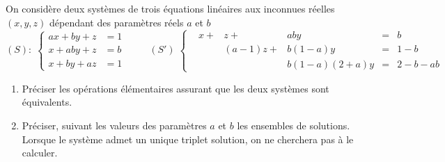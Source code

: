 On considère deux systèmes de trois équations linéaires aux inconnues réelles $(x,y,z)$ dépendant des paramètres réels $a$ et $b$
\begin{displaymath}
(S):\;\left\lbrace 
\begin{aligned}
  ax + by + z &= 1 \\ x + aby + z &= b \\ x + by + az &= 1
\end{aligned}
\right. 
\hspace{1cm}
(S')\;
\left\lbrace 
\begin{aligned}
 &x + &z + &aby &=& b \\ &  &(a-1)z + &b(1-a)y &=& 1 - b \\ &  &  &b(1-a)(2+a)y &=& 2 -b -ab
\end{aligned}
\right. 
\end{displaymath}
\begin{enumerate}
  \item Préciser les opérations élémentaires assurant que les deux systèmes sont équivalents.
  \item Préciser, suivant les valeurs des paramètres $a$ et $b$ les ensembles de solutions. Lorsque le système admet un unique triplet solution, on ne cherchera pas à le calculer.
\end{enumerate}
